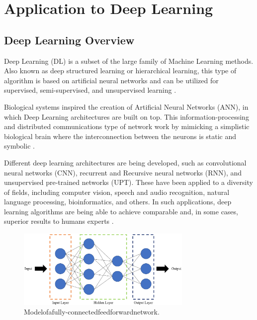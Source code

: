 
\chapter{Application to Deep Learning}
\label{chapter:application}

\section{Deep Learning Overview}
\label{sec:DLO}
Deep Learning (DL) is a subset of the large family of Machine Learning methods. Also known as deep structured learning or hierarchical learning, this type of algorithm is based on artificial neural networks and can be utilized for supervised, semi-supervised, and unsupervised learning \cite{bengio_representation_2013} \cite{schmidhuber_deep_2015}.

Biological systems inspired the creation of Artificial Neural Networks (ANN), in which Deep Learning architectures are built on top. This information-processing and distributed communications type of network work by mimicking a simplistic biological brain where the interconnection between the neurons is static and symbolic \cite{marblestone_toward_2016}. 

Different deep learning architectures are being developed, such as convolutional neural networks (CNN), recurrent and Recursive neural networks (RNN), and unsupervised pre-trained networks (UPT). These have been applied to a diversity of fields, including computer vision, speech and audio recognition, natural language processing, bioinformatics, and others. In such applications, deep learning algorithms are being able to achieve comparable and, in some cases, superior results to humans experts \cite{noauthor_googles_nodate}.

\begin{figure}[!htb]
  \centering
  \includegraphics[width=0.75\textwidth]{Figures/DL/DNNarch.png}
  \caption[]{ Modelofafully-connectedfeedforwardnetwork.}
  \label{fig:DNNarch}
\end{figure}


